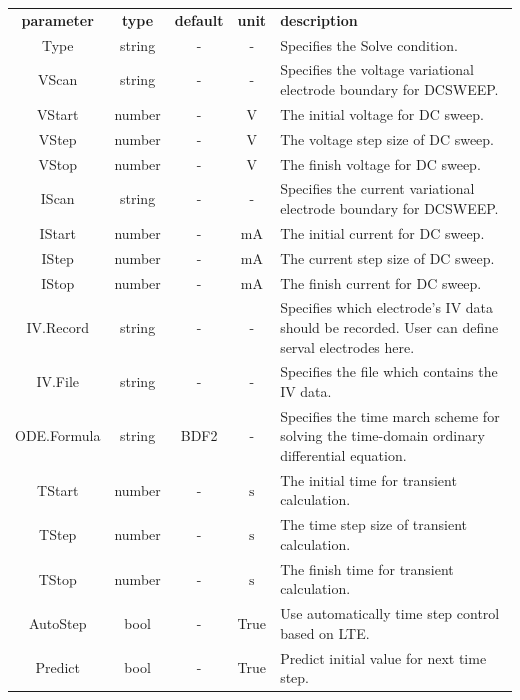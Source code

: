 \documentclass[11pt,pdftex]{article}
\begin{document}
\small \noindent\begin{longtable}{ccccp{7cm}}
\textbf{parameter}   & \textbf{type}    & \textbf{default} & \textbf{unit} & \textbf{description} \\
Type          & string  & -  & -    & Specifies the Solve condition.\\
VScan         & string  & -  & -    & Specifies the voltage variational electrode boundary for DCSWEEP.\\
VStart        & number  & -  & $\mathrm{V}$    & The initial voltage for DC sweep.\\
VStep         & number  & -  & $\mathrm{V}$    & The voltage step size of DC sweep.\\
VStop         & number  & -  & $\mathrm{V}$    & The finish voltage for DC sweep.\\
IScan         & string  & -      & -    & Specifies the current variational electrode boundary for DCSWEEP.\\
IStart        & number  & -  & $\mathrm{mA}$    & The initial current for DC sweep.\\
IStep         & number  & -  & $\mathrm{mA}$    & The current step size of DC sweep.\\
IStop         & number  & -  & $\mathrm{mA}$    & The finish current for DC sweep.\\
IV.Record     & string  & -      & -    & Specifies which electrode's IV data should be recorded.
                                          User can define serval electrodes here. \\
IV.File       & string  & -      & -    & Specifies the file which contains the IV data.\\
ODE.Formula   & string  & BDF2   & -    & Specifies the time march scheme for solving the time-domain ordinary differential equation.\\
TStart        & number  & -  & $\mathrm{s}$    & The initial time for transient calculation.\\
TStep         & number  & -  & $\mathrm{s}$    & The time step size of transient calculation.\\
TStop         & number  & -  & $\mathrm{s}$    & The finish time for transient calculation.\\
AutoStep      & bool    & -  & True            & Use automatically time step control based on LTE.\\
Predict       & bool    & -  & True            & Predict initial value for next time step.\\
\end{longtable}
\normalsize
\end{document}
